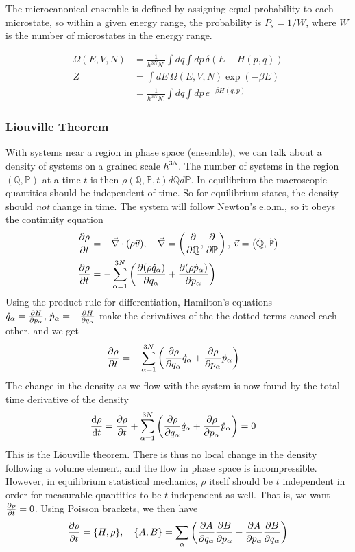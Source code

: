 \documentclass[a4paper, english, 12pt]{article}
\newcommand{\closed}[1]{\left( #1 \right)}
\newcommand{\curly}[1]{\{ #1 \} }
\newcommand{\Q}{\mathbb{Q}}
\renewcommand{\P}{\mathbb{P}}
\begin{document}
\begin{multicols*}{2}
The microcanonical ensemble is defined by assigning equal probability to each microstate, so within a given energy range, the probability is $P_s=1/W$, where $W$ is the number of microstates in the energy range.   

\begin{align*}
    \Omega(E,V,N) &=\frac{1}{h^{3N}N!}\int dq \int dp\, \delta(E-H(p,q)) \\
    Z &= \int dE\, \Omega(E,V,N) \exp(-\beta E) \\
    &= \frac{1}{h^{3N}N!}\int dq \int dp\, e^{-\beta H(q,p)} 
\end{align*}


\subsubsection*{\scriptsize Liouville Theorem}
With systems near a region in phase space (ensemble), we can talk about a density of systems on a grained scale $h^{3N}$. The number of systems in the region $(\Q,\P)$ at a time $t$ is then $\rho(\Q,\P,t)d\Q d\P$. In equilibrium the macroscopic quantities should be independent of time. So for equilibrium states, the density should \textit{not} change in time. The system will follow Newton's e.o.m., so it obeys the continuity equation 
\begin{align*}
    \pdv{\rho}{t} &= -\vec{\nabla} \cdot (\rho \vec{v}),\quad \vec{\nabla}=\closed{\pdv{\Q},\pdv{\P}},\: \vec{v}=\closed{\dot{\Q},\dot{\P}} \\ 
    \pdv{\rho}{t} &= -\sum_{\alpha=1}^{3N}\closed{\pdv{(\rho\dot{q}_\alpha)}{q_\alpha} + \pdv{(\rho\dot{p}_\alpha)}{p_\alpha} }
\end{align*} 
Using the product rule for differentiation, Hamilton's equations $\dot{q}_\alpha=\pdv{H}{p_\alpha},\,\dot{p}_\alpha=-\pdv{H}{q_\alpha}$ make the derivatives of the the dotted terms cancel each other, and we get 
\begin{align*}
    \pdv{\rho}{t} &= -\sum_{\alpha=1}^{3N} \closed{\pdv{\rho}{q_\alpha} \dot{q}_\alpha + \pdv{\rho}{p_\alpha}\dot{p}_\alpha }
\end{align*}  
The change in the density as we flow with the system is now found by the total time derivative of the density 
\begin{align*}
    \dv{\rho}{t} &= \pdv{\rho}{t} + \sum_{\alpha=1}^{3N} \closed{\pdv{\rho}{q_\alpha} \dot{q}_\alpha + \pdv{\rho}{p_\alpha}\dot{p}_\alpha } = 0
\end{align*}
This is the Liouville theorem. There is thus no local change in the density following a volume element, and the flow in phase space is incompressible. However, in equilibrium statistical mechanics, $\rho$ itself should be $t$ independent in order for measurable quantities to be $t$ independent as well. That is, we want $\pdv{\rho}{t}=0$. Using Poisson brackets, we then have 
\begin{align*}
    \pdv{\rho}{t} = \curly{H,\rho},\quad \curly{A,B}=\sum_\alpha \closed{\pdv{A}{q_\alpha}\pdv{B}{p_\alpha} - \pdv{A}{p_\alpha}\pdv{B}{q_\alpha}} 
\end{align*}


\end{multicols*}
\end{document}
